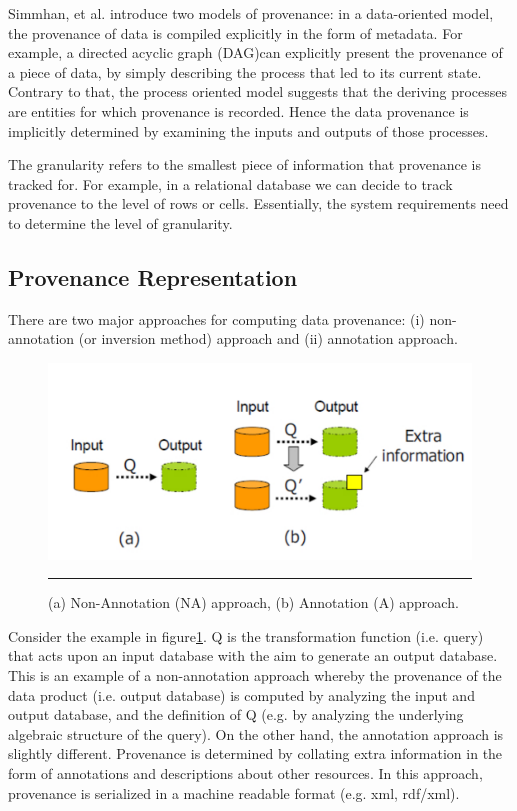 Simmhan, et al.\cite{reference4} introduce two models of provenance: in a data-oriented model, the provenance of data is compiled explicitly in the form of metadata. For example, a directed acyclic graph (DAG)can explicitly present the provenance of a piece of data, by simply describing the process that led to its current state.  Contrary to that, the process oriented model suggests that the deriving processes are entities for which provenance is recorded.  Hence the data provenance is implicitly determined by examining the inputs and outputs of those processes.

The granularity refers to the smallest piece of information that provenance is tracked for. For example, in a relational database we can decide to track provenance to the level of rows or cells. Essentially, the system requirements need to determine the level of granularity.


\subsection{Provenance Representation}
There are two major approaches for computing data provenance\cite{reference5}: (i) non-annotation (or inversion method) approach and (ii) annotation approach.

\begin{figure}[htbp]
	\centering
		\includegraphics[scale=0.5]{./Figures/chapter2/figure3.pdf}
		\rule{35em}{0.5pt}
	\caption[Provenance Represantation]{(a) Non-Annotation (NA) approach, (b) Annotation (A) approach\cite{reference5}.}
	\label{fig:provRepresentation}
\end{figure}

Consider the example in figure\ref{fig:provRepresentation}.  Q is the transformation function (i.e. query) that acts upon an input database with the aim to generate an output database. This is an example of a non-annotation approach whereby the provenance of the data product (i.e. output database) is computed by analyzing the input and output database, and the definition of Q (e.g. by analyzing the underlying algebraic structure of the query\cite{reference6:18}). On the other hand, the annotation approach is slightly different. Provenance is determined by collating extra information in the form of annotations and descriptions about other resources. In this approach, provenance is serialized in a machine readable format (e.g. xml, rdf/xml).



